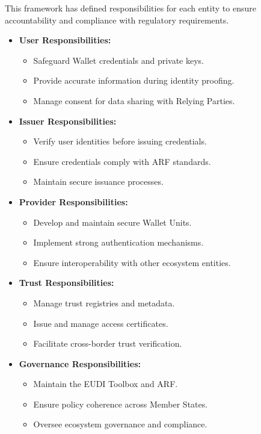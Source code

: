 \documentclass[sigconf,balance,nonacm,authordraft]{acmart}
\begin{document}
This framework has defined responsibilities for each entity to ensure accountability and compliance with regulatory requirements.
\begin{itemize}

  \item \textbf{User Responsibilities:}
    \begin{itemize}
      \item Safeguard Wallet credentials and private keys.
      \item Provide accurate information during identity proofing.
      \item Manage consent for data sharing with Relying Parties.
    \end{itemize}

  \item \textbf{Issuer Responsibilities:}
    \begin{itemize}
      \item Verify user identities before issuing credentials.
      \item Ensure credentials comply with ARF standards.
      \item Maintain secure issuance processes.
    \end{itemize}

  \item \textbf{Provider Responsibilities:}
    \begin{itemize}
      \item Develop and maintain secure Wallet Units.
      \item Implement strong authentication mechanisms.
      \item Ensure interoperability with other ecosystem entities.
    \end{itemize}

  \item \textbf{Trust Responsibilities:}
    \begin{itemize}
      \item Manage trust registries and metadata.
      \item Issue and manage access certificates.
      \item Facilitate cross-border trust verification.
    \end{itemize}

  \item \textbf{Governance Responsibilities:}
    \begin{itemize}
      \item Maintain the EUDI Toolbox and ARF.
      \item Ensure policy coherence across Member States.
      \item Oversee ecosystem governance and compliance.
    \end{itemize}


\end{itemize}
\end{document}
